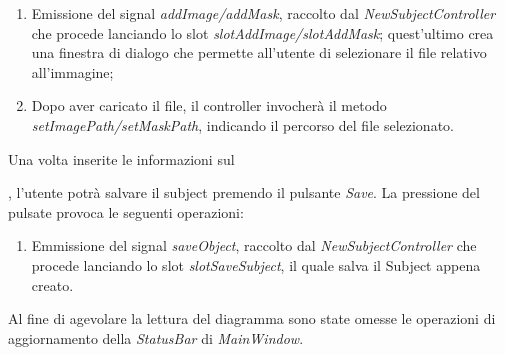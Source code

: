\begin{enumerate}
	\item Emissione del signal\g{} \textit{addImage/addMask}, raccolto dal \textit{NewSubjectController} che procede lanciando lo slot\g{} \textit{slotAddImage/slotAddMask}; quest'ultimo crea una finestra di dialogo che permette all'utente di selezionare il file relativo all'immagine;
	\item Dopo aver caricato il file, il controller invocherà il metodo \textit{setImagePath/setMaskPath}, indicando il percorso del file selezionato.
\end{enumerate}
Una volta inserite le informazioni sul \subject{}, l'utente potrà salvare il subject\g{} premendo il pulsante \textit{Save}. La pressione del pulsate provoca le seguenti operazioni:
\begin{enumerate}
	\item Emmissione del signal\g{} \textit{saveObject}, raccolto dal \textit{NewSubjectController} che procede lanciando lo slot\g{} \textit{slotSaveSubject}, il quale salva il Subject\g{} appena creato.
\end{enumerate}

Al fine di agevolare la lettura del diagramma sono state omesse le operazioni di aggiornamento della \textit{StatusBar} di \textit{MainWindow}.

